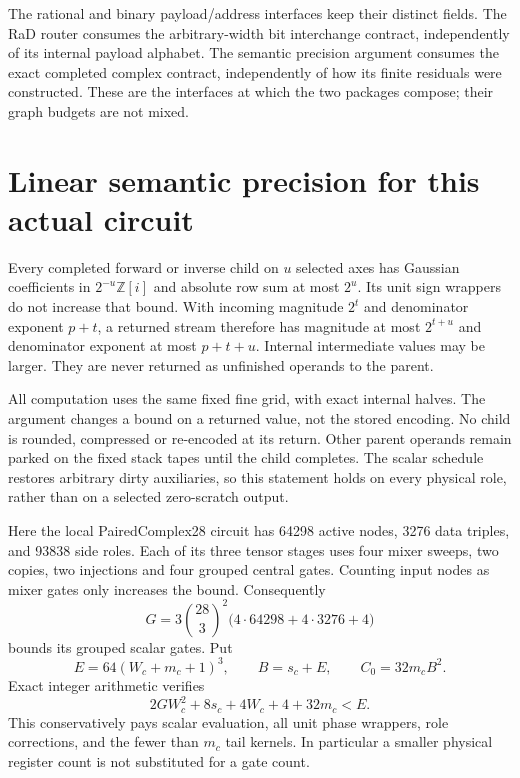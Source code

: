 \documentclass[11pt]{article}
\begin{document}
The rational and binary payload/address interfaces keep their distinct
fields. The RaD router consumes the arbitrary-width bit interchange
contract, independently of its internal payload alphabet. The semantic
precision argument consumes the exact completed complex contract,
independently of how its finite residuals were constructed. These are the
interfaces at which the two packages compose; their graph budgets are
not mixed.

\section{Linear semantic precision for this actual circuit}
Every completed forward or inverse child on $u$ selected axes has Gaussian
coefficients in $2^{-u}\mathbb Z[i]$ and absolute row sum at most $2^u$.
Its unit sign wrappers do not increase that bound. With incoming magnitude
$2^t$ and denominator exponent $p+t$, a returned stream therefore has
magnitude at most $2^{t+u}$ and denominator exponent at most $p+t+u$.
Internal intermediate values may be larger. They are never returned as
unfinished operands to the parent.

All computation uses the same fixed fine grid, with exact internal halves.
The argument changes a bound on a returned value, not the stored encoding.
No child is rounded, compressed or re-encoded at its return. Other parent
operands remain parked on the fixed stack tapes until the child completes.
The scalar schedule restores arbitrary dirty auxiliaries, so this statement
holds on every physical role, rather than on a selected zero-scratch output.

Here the local PairedComplex28 circuit has 64298 active nodes, 3276 data
triples, and 93838 side roles. Each of its three tensor stages uses four
mixer sweeps, two copies, two injections and four grouped central gates.
Counting input nodes as mixer gates only increases the bound. Consequently
\[
 G=3\binom{28}{3}^{\!2}
       \bigl(4\cdot64298+4\cdot3276+4\bigr)
\]
bounds its grouped scalar gates. Put
\[
 E=64(W_c+m_c+1)^3,\qquad B=s_c+E,\qquad C_0=32m_cB^2.
\]
Exact integer arithmetic verifies
\[
 2GW_c^2+8s_c+4W_c+4+32m_c<E.
\]
This conservatively pays scalar evaluation, all unit phase wrappers,
role corrections, and the fewer than $m_c$ tail kernels. In particular a
smaller physical register count is not substituted for a gate count.
\end{document}
